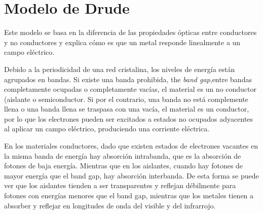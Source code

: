\section{Modelo de Drude}
Este modelo se basa en la diferencia de las propiedades ópticas entre conductores y no conductores y explica cómo es que un metal responde linealmente a un campo eléctrico.


Debido a la periodicidad de una red cristalina, los niveles de energía están agrupados en bandas. Si existe una banda prohibida, the \textit{band gap},entre bandas completamente ocupadas o completamente vacías, el material es un no conductor (aislante o semiconductor. Si por el contrario, una banda no está complemente llena o una banda llena se traspasa con una vacía, el material es un conductor, por lo que los electrones pueden ser excitados a estados no ocupados adyacentes al aplicar un campo eléctrico, produciendo una corriente eléctrica.

En los materiales conductores, dado que existen estados de electrones vacantes en la misma banda de energía hay absorción intrabanda, que es la absorción de fotones de baja energía. Mientras que en los aislantes, cuando hay fotones de mayor energía que el band gap, hay absorción interbanda. De esta forma se puede ver que los aislantes tienden a ser transparentes y reflejan débilmente para fotones con energías menores que el band gap, mientras que los metales tienen a absorber y reflejar en longitudes de onda del visible y del infrarrojo.

